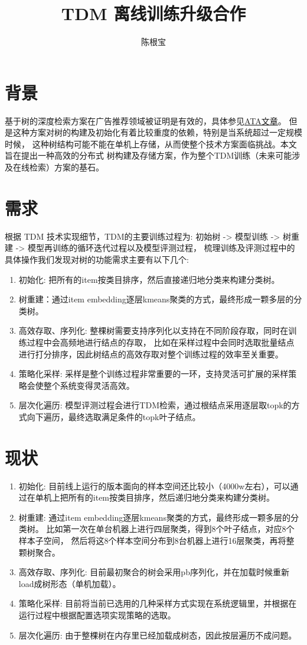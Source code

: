 \documentclass[10pt]{article}
\author{陈根宝}
\title{TDM 离线训练升级合作}
\date{}
\begin{document}
\maketitle
\section{背景}
基于树的深度检索方案在广告推荐领域被证明是有效的，具体参见\href{https://www.atatech.org/articles/102403}{ATA文章}。
但是这种方案对树的构建及初始化有着比较重度的依赖，特别是当系统超过一定规模时候，
这种树结构可能不能在单机上存储，从而使整个技术方案面临挑战。本文旨在提出一种高效的分布式
树构建及存储方案，作为整个TDM训练（未来可能涉及在线检索）方案的基石。

\section{需求}
根据 TDM 技术实现细节，TDM的主要训练过程为: 初始树 -> 模型训练 -> 树重建 -> 模型再训练的循环迭代过程以及模型评测过程，
梳理训练及评测过程中的具体操作我们发现对树的功能需求主要有以下几个:
\begin{enumerate}
\item 初始化: 把所有的item按类目排序，然后直接递归地分类来构建分类树。
\item 树重建：通过item embedding逐层kmeans聚类的方式，最终形成一颗多层的分类树。
\item 高效存取、序列化: 整棵树需要支持序列化以支持在不同阶段存取，同时在训练过程中会高频地进行结点的存取，
  比如在采样过程中会同时选取批量结点进行打分排序，因此树结点的高效存取对整个训练过程的效率至关重要。
\item 策略化采样: 采样是整个训练过程非常重要的一环，支持灵活可扩展的采样策略会使整个系统变得灵活高效。
\item 层次化遍历: 模型评测过程会进行TDM检索，通过根结点采用逐层取topk的方式向下遍历，最终选取满足条件的topk叶子结点。
\end{enumerate}

\section{现状}
\begin{enumerate}
\item 初始化: 目前线上运行的版本面向的样本空间还比较小（4000w左右），可以通过在单机上把所有的item按类目排序，然后递归地分类来构建分类树。
\item 树重建: 通过item embedding逐层kmeans聚类的方式，最终形成一颗多层的分类树。
  比如第一次在单台机器上进行四层聚类，得到8个叶子结点，对应8个样本子空间，
  然后将这8个样本空间分布到8台机器上进行16层聚类，再将整颗树聚合。
\item 高效存取、序列化: 目前最初聚合的树会采用pb序列化，并在加载时候重新load成树形态（单机加载）。
\item 策略化采样: 目前将当前已选用的几种采样方式实现在系统逻辑里，并根据在运行过程中根据配置选项实现策略的选取。
\item 层次化遍历: 由于整棵树在内存里已经加载成树态，因此按层遍历不成问题。
\end{enumerate}
\end{document}
